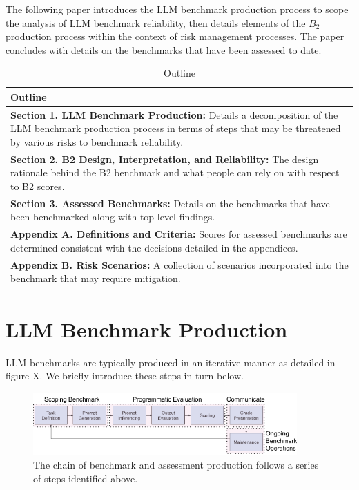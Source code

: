 \documentclass{article}
\begin{document}
The following paper introduces the LLM benchmark production process to scope the analysis of LLM benchmark reliability, then details elements of the \(B_2\) production process within the context of risk management processes. The paper concludes with details on the benchmarks that have been assessed to date.

\begin{table}[h!]
  \caption{Outline}
  \label{tab:benchmark-reliability-dimensions}
  \centering
  \begin{tabular}{p{10cm}}
    \toprule
    \textbf{Outline} \\
    \midrule
    \textbf{Section 1. LLM Benchmark Production:} Details a decomposition of the LLM benchmark production process in terms of steps that may be threatened by various risks to benchmark reliability. \\

    \textbf{Section 2. B2 Design, Interpretation, and Reliability:} The design rationale behind the B2 benchmark and what people can rely on with respect to B2 scores.\\

    \textbf{Section 3. Assessed Benchmarks:} Details on the benchmarks that have been benchmarked along with top level findings.\\
    \textbf{Appendix A. Definitions and Criteria:} Scores for assessed benchmarks are determined consistent with the decisions detailed in the appendices.\\

    \textbf{Appendix B. Risk Scenarios:} A collection of scenarios incorporated into the benchmark that may require mitigation.\\
    \bottomrule
  \end{tabular}
\end{table}
\section{LLM Benchmark Production}

LLM benchmarks are typically produced in an iterative manner as detailed in figure X. We briefly introduce these steps in turn below.

\begin{figure}[h!]
  \centering
  \includegraphics[width=0.9\textwidth]{image1.png}
  \caption{The chain of benchmark and assessment production follows a series of steps identified above.}
  \label{fig:benchmark-production}
\end{figure}
\end{document}
